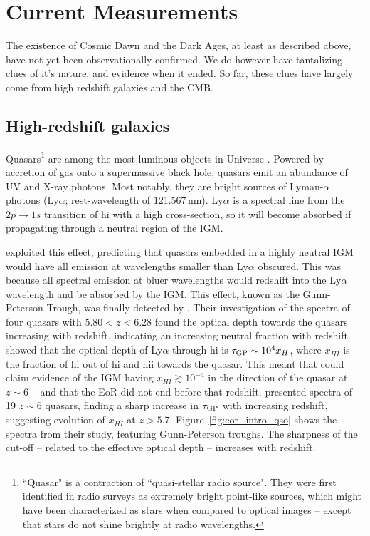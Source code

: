\section{Current Measurements}
\label{sec:eor_intro_current}

The existence of Cosmic Dawn and the Dark Ages, at least as described above, have not yet been observationally confirmed. We do however have tantalizing clues of it's nature, and evidence when it ended. So far, these clues have largely come from high redshift galaxies and the CMB.

\subsection{High-redshift galaxies}

Quasars\footnote{``Quasar" is a contraction of ``quasi-stellar radio source". They were first identified in radio surveys as extremely bright point-like sources, which might have been characterized as stars when compared to optical images -- except that stars do not shine brightly at radio wavelengths.} are among the most luminous objects in Universe \citep[e.g.][]{Manti.17}. Powered by accretion of gas onto a supermassive black hole, quasars emit an abundance of UV and X-ray photons. Most notably, they are bright sources of Lyman-$\alpha$ photons (Ly$\alpha$; rest-wavelength of 121.567\,nm). Ly$\alpha$ is a spectral line from the $2p \rightarrow 1s$ transition of {\sc hi} with a high cross-section, so it will become absorbed if propagating through a neutral region of the IGM. 

\cite{Gunn.65} exploited this effect, predicting that quasars embedded in a highly neutral IGM would have all emission at wavelengths smaller than Ly$\alpha$ obscured. This was because all spectral emission at bluer wavelengths would redshift into the Ly$\alpha$ wavelength and be absorbed by the IGM. This effect, known as the Gunn-Peterson Trough, was finally detected by \cite{Becker.01}. Their investigation of the spectra of four quasars with $5.80<z<6.28$ found the optical depth towards the quasars increasing with redshift, indicating an increasing neutral fraction with redshift. \cite{Gunn.65} showed that the optical depth of Ly$\alpha$ through {\sc hi} is $\tau_{\rm GP}\sim10^4x_H$, where $x_{HI}$ is the fraction of {\sc hi} out of {\sc hi} and {\sc hii} towards the quasar. This meant that \cite{Becker.01} could claim evidence of the IGM having $x_{HI}\gtrsim10^{-4}$ in the direction of the quasar at $z\sim6$ -- and that the EoR did not end before that redshift. \cite{Fan.06.2} presented spectra of 19 $z\sim 6$ quasars, finding a sharp increase in $\tau_{\rm GP}$ with increasing redshift, suggesting evolution of $x_{HI}$ at $z>5.7$. Figure~\ref{fig:eor_intro_qso} shows the spectra from their study, featuring Gunn-Peterson troughs. The sharpness of the cut-off -- related to the effective optical depth -- increases with redshift.

